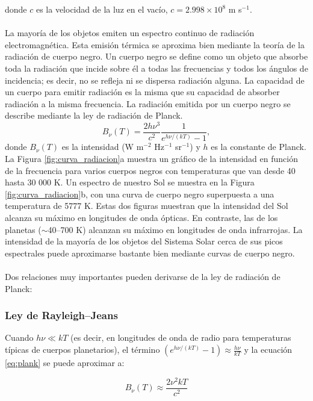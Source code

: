 \documentclass[12pt]{article}
\begin{document}
donde $c$ es la velocidad de la luz en el vacío, $c = 2.998 \times 10^8$ m s$^{-1}$.\\
\\
La mayoría de los objetos emiten un espectro continuo de radiación electromagnética. Esta emisión térmica
se aproxima bien mediante la teoría de la radiación de cuerpo negro. Un cuerpo negro se define como un objeto
que absorbe toda la radiación que incide sobre él a todas las frecuencias y todos los ángulos de incidencia; 
es decir, no se refleja ni se dispersa radiación alguna. La capacidad de un cuerpo para emitir radiación es 
la misma que su capacidad de absorber radiación a la misma frecuencia. La radiación emitida por un cuerpo 
negro se describe mediante la ley de radiación de Planck.
\begin{equation}
    B_{\nu} (T) = \frac{2h\nu^3}{c^2} \frac{1}{e^{h\nu/(kT)} - 1},
    \label{eq:plank}
\end{equation}
donde $B_{\nu} (T)$ es la intensidad (W m$^{-2}$ Hz$^{-1}$ sr$^{-1}$) y $h$ es la constante de Planck. 
La Figura \ref{fig:curva_radiacion}a muestra un gráfico de la intensidad en función de la frecuencia 
para varios cuerpos negros con temperaturas que van desde 40 hasta 30 000 K. Un espectro de nuestro 
Sol se muestra en la Figura \ref{fig:curva_radiacion}b, con una curva de cuerpo negro superpuesta a 
una temperatura de 5777 K. Estas dos figuras muestran que la intensidad del Sol alcanza su máximo en 
longitudes de onda ópticas. En contraste, las de los planetas ($\sim$40–700 K) alcanzan su máximo en 
longitudes de onda infrarrojas. La intensidad de la mayoría de los objetos del Sistema Solar cerca de 
sus picos espectrales puede aproximarse bastante bien mediante curvas de cuerpo negro.\\
\\
Dos relaciones muy importantes pueden derivarse de la ley de radiación de Planck:
\subsubsection{Ley de Rayleigh–Jeans}

Cuando $h\nu \ll kT$ (es decir, en longitudes de onda de radio para temperaturas típicas de cuerpos planetarios), 
el término $(e^{h\nu/(kT)} - 1) \approx \frac{h\nu}{kT}$ y la ecuación \ref{eq:plank} se puede aproximar a:

\begin{equation}
    B_\nu (T) \approx \frac{2\nu^2 kT}{c^2}
    \label{eq:Rayleigh}
\end{equation}
\end{document}
